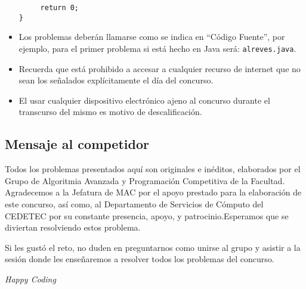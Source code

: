 \begin{itemize}
\begin{verbatim}
     return 0;
}
    \end{verbatim}
    
    \item Los problemas deberán llamarse como se indica en ``Código Fuente'', por ejemplo, para el primer problema si está hecho en Java será: \texttt{alreves.java}.
    
    \item Recuerda que está prohibido a accesar a cualquier recurso de internet que no sean los señalados explícitamente el día del concurso.
    
    \item El usar cualquier dispositivo electrónico ajeno al concurso durante el transcurso del mismo es motivo de descalificación.
    
    
\end{itemize}

\subsection*{Mensaje al competidor}
Todos los problemas presentados aquí son originales e inéditos, elaborados por el Grupo de Algoritmia Avanzada y Programación Competitiva de la Facultad. Agradecemos a la Jefatura de MAC por el apoyo prestado para la elaboración de este concurso, así como, al Departamento de Servicios de Cómputo del CEDETEC por su constante presencia, apoyo, y patrocinio.Esperamos que se diviertan resolviendo estos problema.

Si les gustó el reto, no duden en preguntarnos como unirse al grupo y asistir a la sesión donde les enseñaremos a resolver todos los problemas del concurso.

\bigskip

\begin{center}
    \Large \it Happy Coding
\end{center}


\thispagestyle{empty}